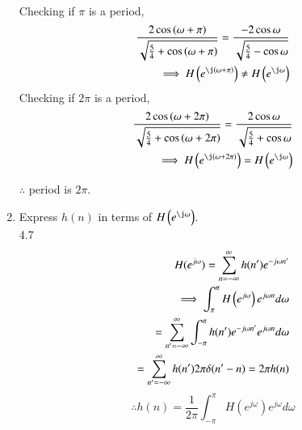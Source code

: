 \documentclass[journal,12pt,twocolumn]{IEEEtran}
\renewcommand\thesection{\arabic{section}}
\begin{document}
\begin{enumerate}[label=\thesection.\arabic*]
\begin{align}
	\end{align}
	Checking if $\pi$ is a period,
	\begin{align}
		\frac{2\cos\brak{\omega+\pi}}{\sqrt{\frac{5}{4}+\cos\brak{\omega+\pi}}} =
		\frac{-2\cos\omega}{\sqrt{\frac{5}{4}-\cos\omega}}\\
		\implies H\brak{e^{\j \brak{\omega+\pi}}} \neq H\brak{e^{\j \omega}}
	\end{align}
	Checking if $2\pi$ is a period,
	\begin{align}
		\frac{2\cos\brak{\omega+2\pi}}{\sqrt{\frac{5}{4}+\cos\brak{\omega + 2\pi}}} =
		\frac{2\cos \omega}{\sqrt{\frac{5}{4} + \cos \omega }}\\
		\implies H\brak{e^{\j \brak{\omega + 2\pi}}} = H\brak{e^{\j \omega}}
	\end{align}
	
	$\therefore$ period is $2\pi$.\\
	\item Express $h(n)$ in terms of $H\brak{e^{\j \omega}}$.\\[5pt]
	4.7 \solution
		\begin{align}
	H( e^{j\omega }) =\sum ^{\infty }_{n=-\infty }h(n') e^{-j\omega n'}\\
	\implies \int_{\-\pi} ^{\pi }	H\left( e^{j\omega }\right) e^{j\omega n}d\omega\\			
	= \sum_{n'=-\infty }^{\infty } \int ^{\pi }_{-\pi }h(n') e^{-j\omega n'}e^{j\omega n}d\omega\\			
	=\sum ^{\infty }_{n'=-\infty }h(n') 2\pi \delta(n'- n) =
	 2\pi h(n) 
		\end{align}
	\begin{equation}
		\therefore	 h(n) =\dfrac{1}{2\pi }\int ^{\pi }_{-\pi }H\left( e^{j \omega}\right) e^{j\omega }d\omega 
	\end{equation}

	\end{enumerate}
	
\end{document}
